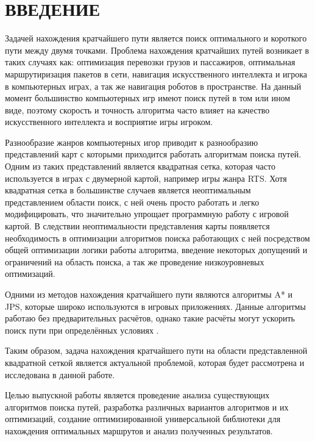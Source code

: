 \section*{ВВЕДЕНИЕ}

\vspace{1\baselineskip} 

Задачей нахождения кратчайшего пути является поиск оптимального и короткого пути между двумя точками. Проблема нахождения кратчайших путей возникает в таких случаях как: оптимизация перевозки грузов и пассажиров, оптимальная маршрутиризация пакетов в сети, навигация искусственного интеллекта и игрока в компьютерных играх, а так же навигация роботов в пространстве. На данный момент большинство компьютерных игр имеют поиск путей в том или ином виде, поэтому скорость и точность алгоритма часто влияет на качество искусственного интеллекта и восприятие игры игроком. 

Разнообразие жанров компьютерных игор приводит к разнообразию представлений карт с которыми приходится работать алгоритмам поиска путей. Одним из таких представлений является квадратная сетка, которая часто используется в играх с двумерной картой, например игры жанра RTS. Хотя квадратная сетка в большинстве случаев является неоптимальным представлением области поиск, с ней очень просто работать и легко модифицировать, что значительно упрощает программную работу с игровой картой. В следствии неоптимальности представления карты появляется необходимость в оптимизации алгоритмов поиска работающих с ней посредством общей оптимизации логики работы алгоритма, введение некоторых допущений и ограничений на область поиска, а так же проведение низкоуровневых оптимизаций.

Одними из методов нахождения кратчайшего пути являются алгоритмы A* и JPS, которые широко используются в игровых приложениях. Данные алгоритмы работаю без предварительных расчётов, однако такие расчёты могут ускорить поиск пути при определённых условиях \cite{PREPROCESSING}. 

Таким образом, задача нахождения кратчайшего пути на области представленной квадратной сеткой является актуальной проблемой, которая будет рассмотрена и исследована в данной работе.

Целью выпускной работы является проведение анализа существующих алгоритмов поиска путей, разработка различных вариантов алгоритмов и их оптимизаций, создание оптимизированной универсальной библиотеки для нахождения оптимальных маршрутов и анализ полученных результатов.

